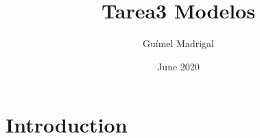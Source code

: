 \documentclass{article}
\title{Tarea3 Modelos}
\author{Guímel Madrigal}
\date{June 2020}
\begin{document}
\maketitle

\section{Introduction}
\end{document}
